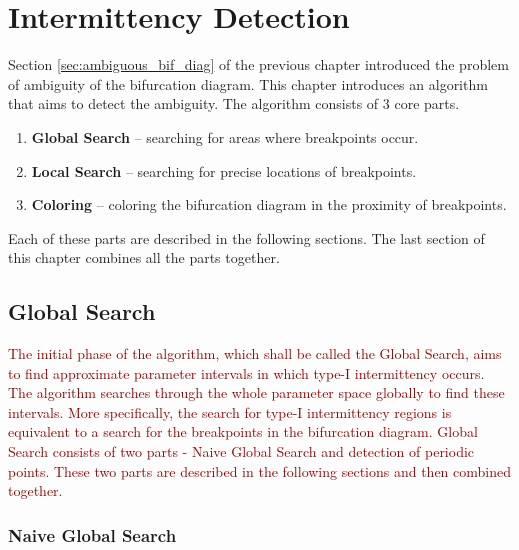 \chapter{Intermittency Detection}
\label{chapter:intdetection}
Section \ref{sec:ambiguous_bif_diag} of the previous chapter introduced the problem of ambiguity of the bifurcation diagram.
This chapter introduces an algorithm that aims to detect the ambiguity.
The algorithm consists of 3 core parts.

\begin{enumerate}
	\item \textbf{Global Search} -- searching for areas where breakpoints occur.
	\item \textbf{Local Search} -- searching for precise locations of breakpoints.
	\item \textbf{Coloring} -- coloring the bifurcation diagram in the proximity of breakpoints.
\end{enumerate}

Each of these parts are described in the following sections.
The last section of this chapter combines all the parts together.

\section{Global Search}
\label{sec:globsearch}
\textcolor{darkred}{
The initial phase of the algorithm, which shall be called the Global Search, aims to find approximate parameter intervals in which type-I intermittency occurs.
The algorithm searches through the whole parameter space globally to find these intervals.
More specifically, the search for type-I intermittency regions is equivalent to a search for the breakpoints in the bifurcation diagram.
Global Search consists of two parts - Naive Global Search and detection of periodic points.
These two parts are described in the following sections and then combined together.
}
\subsection{Naive Global Search}

